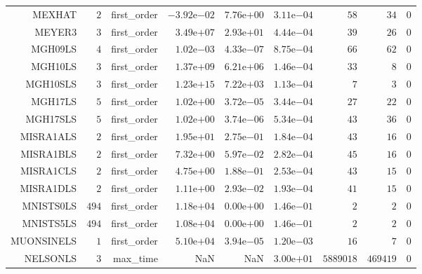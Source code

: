 \begin{longtable}{rrrrrrrrr}
MEXHAT & \(     2\) & first\_order & \(-3.92\)e\(-02\) & \( 7.76\)e\(+00\) & \( 3.11\)e\(-04\) & \(    58\) & \(    34\) & \(     0\) \\
MEYER3 & \(     3\) & first\_order & \( 3.49\)e\(+07\) & \( 2.93\)e\(+01\) & \( 4.44\)e\(-04\) & \(    39\) & \(    26\) & \(     0\) \\
MGH09LS & \(     4\) & first\_order & \( 1.02\)e\(-03\) & \( 4.33\)e\(-07\) & \( 8.75\)e\(-04\) & \(    66\) & \(    62\) & \(     0\) \\
MGH10LS & \(     3\) & first\_order & \( 1.37\)e\(+09\) & \( 6.21\)e\(+06\) & \( 1.46\)e\(-04\) & \(    33\) & \(     8\) & \(     0\) \\
MGH10SLS & \(     3\) & first\_order & \( 1.23\)e\(+15\) & \( 7.22\)e\(+03\) & \( 1.13\)e\(-04\) & \(     7\) & \(     3\) & \(     0\) \\
MGH17LS & \(     5\) & first\_order & \( 1.02\)e\(+00\) & \( 3.72\)e\(-05\) & \( 3.44\)e\(-04\) & \(    27\) & \(    22\) & \(     0\) \\
MGH17SLS & \(     5\) & first\_order & \( 1.02\)e\(+00\) & \( 3.74\)e\(-06\) & \( 5.34\)e\(-04\) & \(    43\) & \(    36\) & \(     0\) \\
MISRA1ALS & \(     2\) & first\_order & \( 1.95\)e\(+01\) & \( 2.75\)e\(-01\) & \( 1.84\)e\(-04\) & \(    43\) & \(    16\) & \(     0\) \\
MISRA1BLS & \(     2\) & first\_order & \( 7.32\)e\(+00\) & \( 5.97\)e\(-02\) & \( 2.82\)e\(-04\) & \(    45\) & \(    16\) & \(     0\) \\
MISRA1CLS & \(     2\) & first\_order & \( 4.75\)e\(+00\) & \( 1.88\)e\(-01\) & \( 2.53\)e\(-04\) & \(    43\) & \(    15\) & \(     0\) \\
MISRA1DLS & \(     2\) & first\_order & \( 1.11\)e\(+00\) & \( 2.93\)e\(-02\) & \( 1.93\)e\(-04\) & \(    41\) & \(    15\) & \(     0\) \\
MNISTS0LS & \(   494\) & first\_order & \( 1.18\)e\(+04\) & \( 0.00\)e\(+00\) & \( 1.46\)e\(-01\) & \(     2\) & \(     2\) & \(     0\) \\
MNISTS5LS & \(   494\) & first\_order & \( 1.08\)e\(+04\) & \( 0.00\)e\(+00\) & \( 1.46\)e\(-01\) & \(     2\) & \(     2\) & \(     0\) \\
MUONSINELS & \(     1\) & first\_order & \( 5.10\)e\(+04\) & \( 3.94\)e\(-05\) & \( 1.20\)e\(-03\) & \(    16\) & \(     7\) & \(     0\) \\
NELSONLS & \(     3\) & max\_time &       NaN &       NaN & \( 3.00\)e\(+01\) & \(5889018\) & \(469419\) & \(     0\) \\

\end{longtable}
